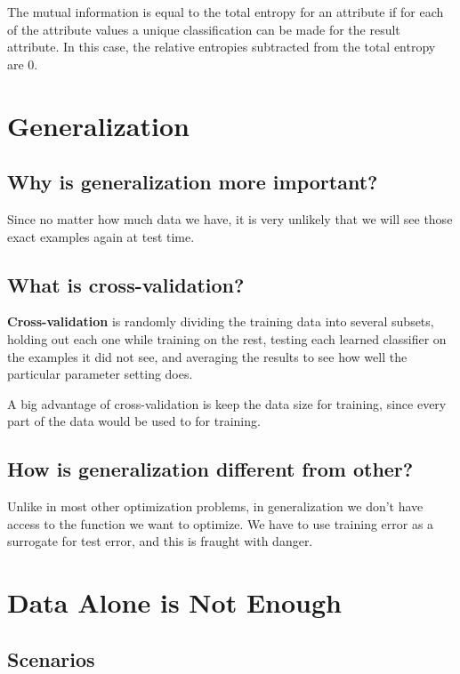 \documentclass[10pt]{article}
\begin{document}
The mutual information is equal to the total entropy for an attribute if for
each of the attribute values a unique classification can be made for the result
attribute. In this case, the relative entropies subtracted from the total
entropy are 0.

\section{Generalization}

\subsection{Why is generalization more important?}

Since no matter how much data we have, it is very unlikely that we will see
those exact examples again at test time.

\subsection{What is cross-validation? }

\textbf{Cross-validation} is randomly dividing the training data into several
subsets, holding out each one while training on the rest, testing each learned
classifier on the examples it did not see, and averaging the results to see how
well the particular parameter setting does.

A big advantage of cross-validation is keep the data size for training, since
every part of the data would be used to for training.

\subsection{How is generalization different from other?}

Unlike in most other optimization problems, in generalization we don’t have
access to the function we want to optimize. We have to use training error as a
surrogate for test error, and this is fraught with danger.

\section{Data Alone is Not Enough}

\subsection{Scenarios}
\end{document}
